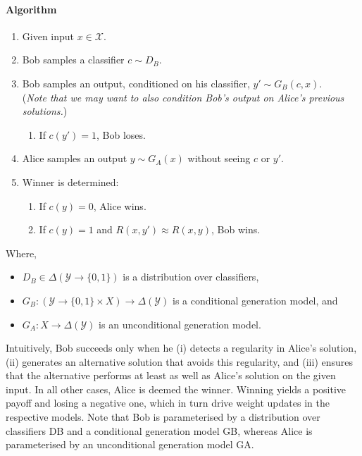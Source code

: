 \paragraph{Algorithm} %
\begin{enumerate}
    \item Given input $x \in \mathcal{X}$.
    \item Bob samples a classifier $c \sim D_\mathit{B}$.
    \item Bob samples an output, conditioned on his classifier, $y' \sim  G_\mathit{B}(c, x)$. \\ (\textit{Note that we may want to also condition Bob's output on Alice's previous solutions.})
    \begin{enumerate}
        \item If $c(y') = 1$, Bob loses.
    \end{enumerate}
    \item Alice samples an output $y \sim G_\mathit{A}(x)$ without seeing $c$ or $y'$.
    \item Winner is determined:
    \begin{enumerate}
        \item If $c(y) = 0$, Alice wins.
        \item If $c(y) = 1$ and $R(x, y') \approx R(x, y)$, Bob wins.
    \end{enumerate}
\end{enumerate}
Where, 
\begin{itemize}
    \item $D_B \in \Delta(\mathcal{Y} \to \{0, 1\})$ is a distribution over classifiers,
    \item ${G_B: (\mathcal{Y} \to \{0, 1\} \times X) \to \Delta(\mathcal{Y})}$ is a conditional generation model, and
    \item $G_A: X \to \Delta(\mathcal{Y})$ is an unconditional generation model.
\end{itemize}

Intuitively, Bob succeeds only when he (i) detects a regularity in Alice’s solution, (ii) generates an alternative solution that avoids this regularity, and (iii) ensures that the alternative performs at least as well as Alice’s solution on the given input. In all other cases, Alice is deemed the winner. Winning yields a positive payoff and losing a negative one, which in turn drive weight updates in the respective models.
Note that Bob is parameterised by a distribution over classifiers DB and a conditional generation model GB, whereas Alice is parameterised by an unconditional generation model GA.

